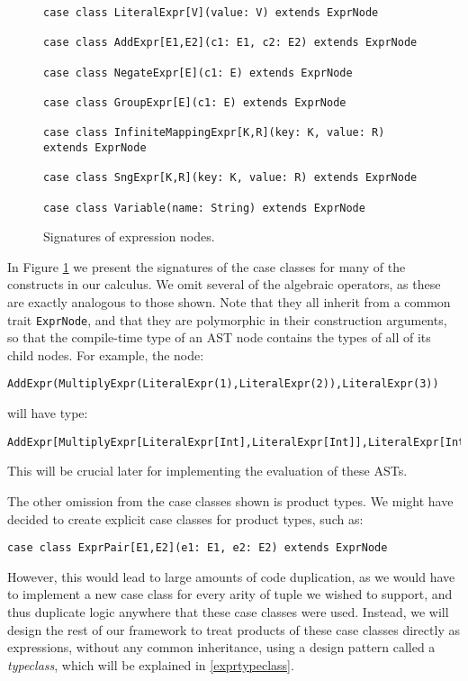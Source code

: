 \begin{figure}
\begin{lstlisting}
case class LiteralExpr[V](value: V) extends ExprNode

case class AddExpr[E1,E2](c1: E1, c2: E2) extends ExprNode

case class NegateExpr[E](c1: E) extends ExprNode

case class GroupExpr[E](c1: E) extends ExprNode

case class InfiniteMappingExpr[K,R](key: K, value: R) extends ExprNode

case class SngExpr[K,R](key: K, value: R) extends ExprNode

case class Variable(name: String) extends ExprNode

\end{lstlisting}
\caption{Signatures of expression nodes.}
\label{exprnodes}
\end{figure}

In Figure \ref{exprnodes} we present the signatures of the case classes for many of the constructs in our calculus. We omit several of the algebraic operators, as these are exactly analogous to those shown. Note that they all inherit from a common trait \lstinline{ExprNode}, and that they are polymorphic in their construction arguments, so that the compile-time type of an AST node contains the types of all of its child nodes. For example, the node:
\vs\begin{lstlisting}
AddExpr(MultiplyExpr(LiteralExpr(1),LiteralExpr(2)),LiteralExpr(3))
\end{lstlisting}\vs
will have type:
\vs\begin{lstlisting}
AddExpr[MultiplyExpr[LiteralExpr[Int],LiteralExpr[Int]],LiteralExpr[Int]]
\end{lstlisting}\vs
This will be crucial later for implementing the evaluation of these ASTs.

The other omission from the case classes shown is product types. We might have decided to create explicit case classes for product types, such as:
\vs\begin{lstlisting}
case class ExprPair[E1,E2](e1: E1, e2: E2) extends ExprNode
\end{lstlisting}\vs
However, this would lead to large amounts of code duplication, as we would have to implement a new case class for every arity of tuple we wished to support, and thus duplicate logic anywhere that these case classes were used. Instead, we will design the rest of our framework to treat products of these case classes directly as expressions, without any common inheritance, using a design pattern called a \textit{typeclass}, which will be explained in \ref{exprtypeclass}.


